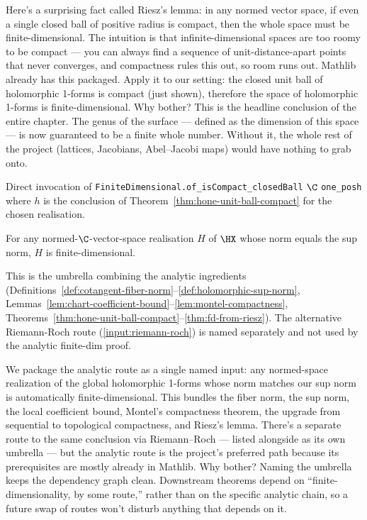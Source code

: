 \begin{layman}
Here's a surprising fact called Riesz's lemma: in any normed vector
space, if even a single closed ball of positive radius is compact, then
the whole space must be finite-dimensional. The intuition is that
infinite-dimensional spaces are too roomy to be compact — you can always
find a sequence of unit-distance-apart points that never converges, and
compactness rules this out, so room runs out. Mathlib already has this
packaged. Apply it to our setting: the closed unit ball of holomorphic
1-forms is compact (just shown), therefore the space of holomorphic
1-forms is finite-dimensional. Why bother? This is the headline
conclusion of the entire chapter. The genus of the surface — defined as
the dimension of this space — is now guaranteed to be a finite whole
number. Without it, the whole rest of the project (lattices, Jacobians,
Abel–Jacobi maps) would have nothing to grab onto.
\end{layman}

\begin{proofsketch}
Direct invocation of
\texttt{FiniteDimensional.of\_isCompact\_closedBall} \(\C\) \texttt{one\_pos\;h}
where \(h\) is the conclusion of
Theorem~\ref{thm:hone-unit-ball-compact} for the chosen realisation.
\end{proofsketch}

\begin{theorem}
\label{input:finite-dimensionality}
\leanok
For any normed-\(\C\)-vector-space realisation \(H\) of \(\HX\) whose
norm equals the sup norm, \(H\) is finite-dimensional.

This is the umbrella combining the analytic ingredients
(Definitions~\ref{def:cotangent-fiber-norm}--\ref{def:holomorphic-sup-norm},
Lemmas~\ref{lem:chart-coefficient-bound}--\ref{lem:montel-compactness},
Theorems~\ref{thm:hone-unit-ball-compact}--\ref{thm:fd-from-riesz}).
The alternative Riemann-Roch route (\ref{input:riemann-roch}) is named
separately and not used by the analytic finite-dim proof.
\end{theorem}

\begin{layman}
We package the analytic route as a single named input: any normed-space
realization of the global holomorphic 1-forms whose norm matches our
sup norm is automatically finite-dimensional. This bundles the fiber
norm, the sup norm, the local coefficient bound, Montel's compactness
theorem, the upgrade from sequential to topological compactness, and
Riesz's lemma. There's a separate route to the same conclusion via
Riemann–Roch — listed alongside as its own umbrella — but the analytic
route is the project's preferred path because its prerequisites are
mostly already in Mathlib. Why bother? Naming the umbrella keeps the
dependency graph clean. Downstream theorems depend on
``finite-dimensionality, by some route,'' rather than on the specific
analytic chain, so a future swap of routes won't disturb anything that
depends on it.
\end{layman}

